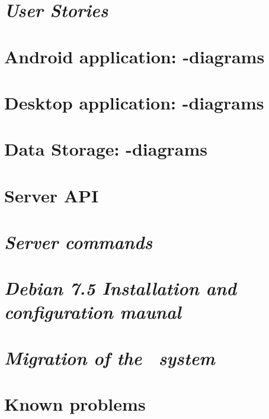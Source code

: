 \begin{appendix}

\chapter{\textit{User Stories}}


\chapter{Android application: -diagrams}


\chapter{Desktop application: -diagrams}
\label{chap:des_appendix}
%

\chapter{Data Storage: -diagrams}
\label{chap:dat_umls}


\chapter{Server API}


\chapter{\textit{Server commands}}


%

\chapter{\textit{Debian 7.5 Installation and configuration maunal}}


\chapter{\textit{Migration of the \appName\ system}}


\chapter{Known problems}
\label{chap:knownProblems}


\end{appendix}
